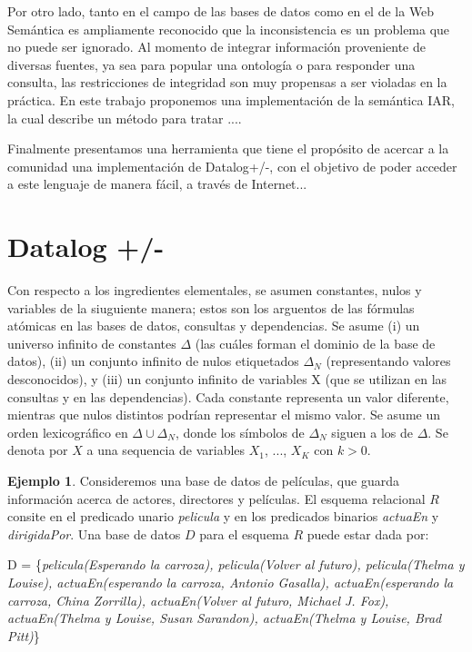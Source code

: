 \documentclass[11pt,a4paper,twoside]{tesis}
\theoremstyle{definition}
\newtheorem{exmp}{Ejemplo}
\begin{document}
Por otro lado, tanto en el campo de las bases de datos como en el de la Web Semántica es ampliamente reconocido que la inconsistencia es un problema que no puede ser ignorado. Al momento de integrar información proveniente de diversas fuentes, ya sea para popular una ontología o para responder una consulta, las restricciones de integridad son muy propensas a ser violadas en la práctica. En este trabajo proponemos una implementación de la semántica IAR, la cual describe un método para tratar ....

Finalmente presentamos una herramienta que tiene el propósito de acercar a la comunidad una implementación de Datalog+/-, con el objetivo de poder acceder a este lenguaje de manera fácil, a través de Internet...

\section{Datalog +/-}

Con respecto a los ingredientes elementales, se asumen constantes, nulos y variables de la siuguiente manera; estos son los arguentos de las fórmulas atómicas en las bases de datos, consultas y dependencias.
Se asume (i) un universo infinito de constantes  $\Delta$ (las cuáles forman el dominio de la base de  datos), (ii) un conjunto infinito de nulos etiquetados $\Delta_{N}$ (representando valores desconocidos), y (iii) un conjunto infinito de variables X (que se utilizan en las consultas y en las dependencias). Cada constante representa un valor diferente, mientras que nulos distintos podrían representar el mismo valor. 
Se asume un orden lexicográfico en  $\Delta \cup \Delta_{N}$, donde los símbolos de $\Delta_{N}$ siguen a los de $\Delta$. Se denota por $X$ a una sequencia de variables $X_{1}$, ..., $X_{K}$ con $k > 0$.


\begin{exmp}
Consideremos una base de datos de películas, que guarda información acerca de actores, directores y películas. El esquema relacional $R$ consite en el predicado unario \textit{pelicula} y en los predicados binarios \textit{actuaEn} y \textit{dirigidaPor}. Una base de datos $D$ para el esquema  $R$ puede estar dada por: 

D = \{\textit{pelicula(Esperando la carroza), pelicula(Volver al futuro), pelicula(Thelma y Louise), actuaEn(esperando la carroza, Antonio Gasalla), actuaEn(esperando la carroza, China Zorrilla), actuaEn(Volver al futuro, Michael J. Fox), actuaEn(Thelma y Louise, Susan Sarandon), actuaEn(Thelma y Louise, Brad Pitt)}\}


\end{exmp}
\end{document}
